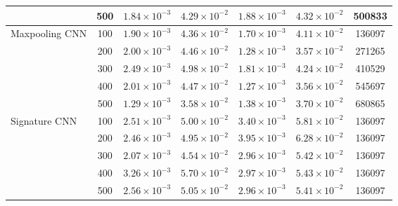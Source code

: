 \documentclass[]{article}
\renewcommand{\(}{\left(}
\renewcommand{\)}{\right)}
\begin{document}
\begin{table}[H]
{\begin{tabular}{l c c c c c c}
				&500&$1.84\times10^{-3}$&$4.29\times10^{-2}$&$1.88\times10^{-3}$&$4.32\times10^{-2}$&500833\\
				\hline
				\multirow{5}{*}{Maxpooling CNN}&100&$1.90\times10^{-3}$&$4.36\times10^{-2}$&$1.70\times10^{-3}$&$4.11\times10^{-2}$&136097\\
				&200&$2.00\times10^{-3}$&$4.46\times10^{-2}$&$1.28\times10^{-3}$&$3.57\times10^{-2}$&271265\\
				&300&$2.49\times10^{-3}$&$4.98\times10^{-2}$&$1.81\times10^{-3}$&$4.24\times10^{-2}$&410529\\
				&400&$2.01\times10^{-3}$&$4.47\times10^{-2}$&$1.27\times10^{-3}$&$3.56\times10^{-2}$&545697\\
				&500&$1.29\times10^{-3}$&$3.58\times10^{-2}$&$1.38\times10^{-3}$&$3.70\times10^{-2}$&680865\\
				\hline
				\multirow{5}{*}{Signature CNN}&100&$2.51\times10^{-3}$&$5.00\times10^{-2}$&$3.40\times10^{-3}$&$5.81\times10^{-2}$&136097\\
				&200&$2.46\times10^{-3}$&$4.95\times10^{-2}$&$3.95\times10^{-3}$&$6.28\times10^{-2}$&136097\\
				&300&$2.07\times10^{-3}$&$4.54\times10^{-2}$&$2.96\times10^{-3}$&$5.42\times10^{-2}$&136097\\
				&400&$3.26\times10^{-3}$&$5.70\times10^{-2}$&$2.97\times10^{-3}$&$5.43\times10^{-2}$&136097\\
				&500&$2.56\times10^{-3}$&$5.05\times10^{-2}$&$2.96\times10^{-3}$&$5.41\times10^{-2}$&136097\\
				\bottomrule
		\end{tabular}}
	\end{table}
	
\end{document}
